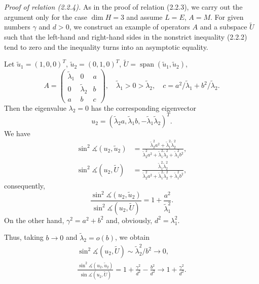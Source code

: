 \documentclass[11pt,oneside]{book}
\newcommand{\myspan}{\operatorname{span}}
\newcommand{\ang}{\measuredangle}
\begin{document}
\textit{Proof of relation (2.2.4).} As in the proof of relation (2.2.3), we carry out the argument only for the case $\dim H = 3$ and assume $L = E$, $A = M$. For given numbers $\gamma$ and $d > 0$, we construct an example of operators $A$ and a subspace $\widetilde{U}$ such that the left-hand and right-hand sides in the nonstrict inequality (2.2.2) tend to zero and the inequality turns into an asymptotic equality.

Let $\tilde{u}_1 = (1, 0, 0)^T$, $\tilde{u}_2 = (0, 1, 0)^T$, $\widetilde{U} = \myspan(\tilde{u}_1, \tilde{u}_2)$,
\[
A = \begin{pmatrix} \tilde{\lambda}_1 & 0 & a \\ 0 & \tilde{\lambda}_2 & b \\ a & b & c \end{pmatrix} , \quad \tilde{\lambda}_1 > 0 > \tilde{\lambda}_2 , \quad c = a^2 / \tilde{\lambda}_1 + b^2 / \tilde{\lambda}_2 .
\]
Then the eigenvalue $\lambda_2 = 0$ has the corresponding eigenvector
\[
u_2 = (\tilde{\lambda}_2 a, \tilde{\lambda}_1 b, -\tilde{\lambda}_1 \tilde{\lambda}_2)^T .
\]
We have
\[
\begin{aligned}
\sin^2 \ang(u_2, \tilde{u}_2) &= \frac{\tilde{\lambda}_2^2 a^2 + \tilde{\lambda}_1^2 \tilde{\lambda}_2^2}{\tilde{\lambda}_2^2 a^2 + \tilde{\lambda}_1^2 \tilde{\lambda}_2^2 + \tilde{\lambda}_1^2 b^2} , \\
\sin^2 \ang(u_2, \widetilde{U}) &= \frac{\tilde{\lambda}_1^2 \tilde{\lambda}_2^2}{\tilde{\lambda}_2^2 a^2 + \tilde{\lambda}_1^2 \tilde{\lambda}_2^2 + \tilde{\lambda}_1^2 b^2} ,
\end{aligned}
\]
consequently,
\[
\frac{\sin^2 \ang(u_2, \tilde{u}_2)}{\sin^2 \ang(u_2, \widetilde{U})} = 1 + \frac{a^2}{\tilde{\lambda}_1^2} .
\]
On the other hand, $\gamma^2 = a^2 + b^2$ and, obviously, $d^2 = \lambda_1^2$. %

Thus, taking $b \to 0$ and $\tilde{\lambda}_2 = o(b)$, we obtain
\begin{gather*}
\sin^2 \ang(u_2, \widetilde{U}) \sim \tilde{\lambda}_2^2 / b^2 \to 0 , \\
\frac{\sin^2 \ang(u_2, \tilde{u}_2)}{\sin \ang(u_2, \widetilde{U})} = 1 + \frac{\gamma^2}{d^2} - \frac{b^2}{d^2} \longrightarrow 1 + \frac{\gamma^2}{d^2} . %
\end{gather*}
\end{document}
